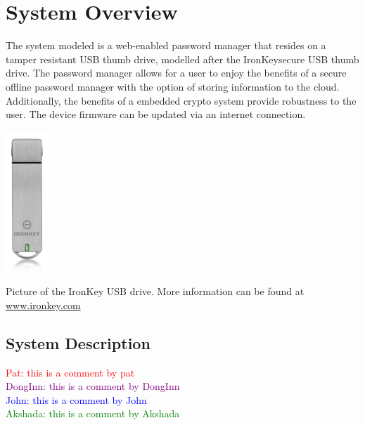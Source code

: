 \documentclass{tufte-book}
\newcommand{\john}[1]{{\textcolor{blue}{John: #1}}}
\newcommand{\akshada}[1]{{\textcolor{green}{Akshada: #1}}}
\newcommand{\donginn}[1]{{\textcolor{purple}{DongInn: #1}}}
\newcommand{\pat}[1]{{\textcolor{red}{Pat: #1}}}
\begin{document}
\cleardoublepage
\chapter{System Overview}
\label{ch:System Overview}
The system modeled is a web-enabled password manager that resides on a tamper resistant USB thumb drive, modelled after the IronKey\texttrademark secure USB thumb drive. The password manager allows for a user to enjoy the benefits of a secure offline password manager with the option of storing information to the cloud.  Additionally, the benefits of a embedded crypto system provide robustness to the user.  The device firmware can be updated via an internet connection.

\begin{marginfigure}%
\centering
  \includegraphics[width=0.25\linewidth]{s1000-vertical}
  \caption{Picture of the IronKey USB drive.  More information can be found at \url{www.ironkey.com}}
  \label{fig:ik}
\end{marginfigure}



\section{System Description}
\label{sec:sysdesc}

\pat{this is a comment by pat}\\
\donginn{this is a comment by DongInn}\\
\john{this is a comment by John}\\
\akshada{this is a comment by Akshada}\\
\end{document}

